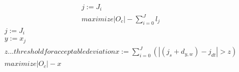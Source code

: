 \documentclass[a4paper,12pt,twoside]{scrreprt}
\begin{document}
\begin{flushleft}
\begin{equation}
	\label{objective_function_5}
	\begin{split}
		j := J_{i} \\
		maximize |O_{c}| - \sum_{i=0}^{J}l_{j}
	\end{split}
	\end{equation}
	\begin{equation}
	\label{objective_function_6}
	\begin{split}
		j := J_{i} \\
		y := x_{j} \\
		z ... threshold for acceptable deviation
		x := \sum_{i=0}^{J} (|(j_{s} + d_{y,w}) - j_{dt}| > z)\\
		maximize |O_{c}| - x
	\end{split}
	\end{equation}
\end{flushleft}
\end{document}
